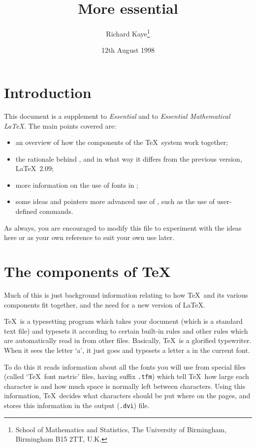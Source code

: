 \documentclass[11pt,a4paper]{article}
\title{More essential \LaTeXe}
\author{Richard Kaye\thanks{School of Mathematics and Statistics, 
The University of Birmingham, Birmingham B15 2TT, U.K.}}%
\date{12th August 1998}
\newcommand{\fn}[1]{{\tt #1}}
\begin{document}
\maketitle
\tableofcontents

\section{Introduction}

This document is a supplement to {\it Essential \LaTeXe} and to
{\it Essential Mathematical \LaTeX}.  The main points covered are:
\begin{itemize}
\item an overview of how the components of the \TeX~system work together;
\item the rationale behind \LaTeXe, and in what way it differs from the
previous version, \LaTeX~2.09;
\item more information on the use of fonts in \LaTeXe;
\item some ideas and pointers more advanced use of \LaTeXe, such as the 
use of user-defined commands.
\end{itemize}

As always, you are encouraged to modify this file to experiment with the
ideas here or as your own reference to suit your own use later.

\section{The components of \TeX}

Much of this is just background information relating to
how \TeX\ and its various components fit together, and the need
for a new version of \LaTeX.

\TeX~is a typesetting program which takes your document (which is a
standard text file) and typesets it according to certain built-in rules
and other rules which are automatically read in from other files.
Basically, \TeX\ is a glorified typewriter.  When it sees the letter
`a', it just goes and typesets a letter a in the current font.  

To do this it reads information about all the fonts you will use
from special files (called `\TeX~font metric' files, having 
suffix \fn{.tfm}) which tell \TeX~how large each character is
and how much space is normally left between characters.  Using this
information, \TeX~decides what characters should be put where on the 
pages, and stores this information in the output (\fn{.dvi}) file.
\end{document}
